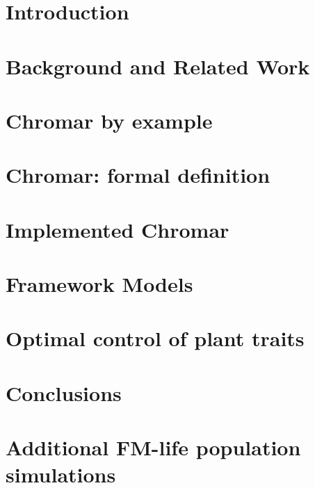\documentclass[phd, logo]{infthesis}
\begin{document}
\chapter{Introduction}
\label{chp:intro}


\chapter{Background and Related Work}
\label{chp:relWork}


\chapter{Chromar by example}
\label{chp:chromarEx}


\chapter{Chromar: formal definition}
\label{chp:chromarForm}


\chapter{Implemented Chromar}
\label{chp:chromarImpl}


\chapter{Framework Models}
\label{chp:fms}


\chapter{Optimal control of plant traits}
\label{chp:oc}


\chapter{Conclusions}
\label{chp:concl}



\singlespace

% 

\printbibliography[heading=bibintoc]

\appendix
\chapter{Additional FM-life population simulations}
\label{app:fmLifeMore}


\end{document}
